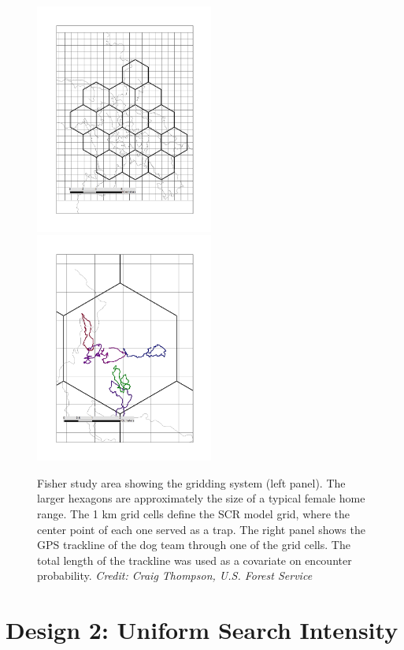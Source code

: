 \begin{figure}
\centering
\includegraphics[width=2.3in]{Ch15-searchencounter/figs/fisher_map.jpg}
\includegraphics[width=2.3in]{Ch15-searchencounter/figs/fisher_tracklog.jpg}
\caption{
Fisher study area showing the gridding system (left panel). The larger
hexagons are approximately the size of a typical female home
range. The 1 km grid cells define the SCR model grid, where the center
point of each one served as a trap. The right panel shows the GPS
trackline of the dog team through one of the grid cells. The total
length of the trackline was used as a covariate on encounter probability.
{\it Credit: Craig Thompson, U.S. Forest Service}
}
\label{searchencounter.fig.fisherstudy}
\end{figure}






\section{Design 2: Uniform Search Intensity}

